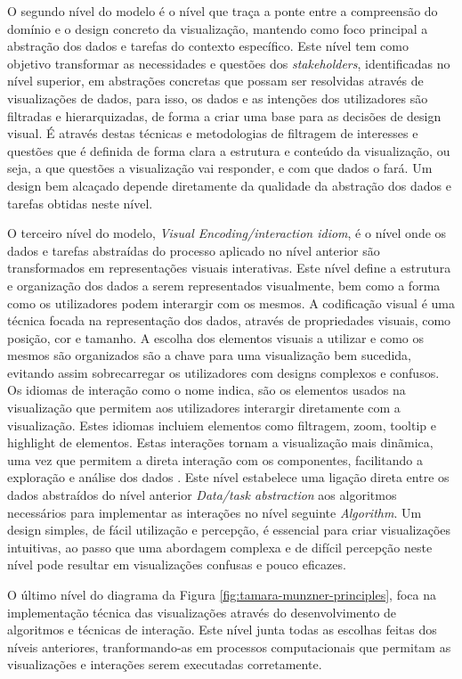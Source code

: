 O segundo nível do modelo é o nível que traça a ponte entre a compreensão do domínio e o design concreto da visualização, mantendo como foco principal a abstração dos dados e tarefas  do contexto específico. Este nível tem como objetivo transformar as necessidades e questões dos \textit{stakeholders}, identificadas no nível superior, em abstrações concretas que possam ser resolvidas através de visualizações de dados, para isso, os dados e as intenções dos utilizadores são filtradas e hierarquizadas, de forma a criar uma base para as decisões de design visual. 
É através destas técnicas e metodologias de filtragem de interesses e questões que é definida de forma clara a estrutura e conteúdo da visualização, ou seja, a que questões a visualização vai responder, e com que dados o fará. Um design bem alcaçado depende diretamente da qualidade da abstração dos dados e tarefas obtidas neste nível.

O terceiro nível do modelo, \textit{Visual Encoding/interaction idiom}, é o nível onde os dados e tarefas abstraídas do processo aplicado no nível anterior são transformados em representações visuais interativas. Este nível define a estrutura e organização dos dados a serem representados visualmente, bem como a forma como os utilizadores podem interargir com os mesmos.
A codificação visual é uma técnica focada na representação dos dados, através de propriedades visuais, como posição, cor e tamanho. A escolha dos elementos visuais a utilizar e como os mesmos são organizados são a chave para uma visualização bem sucedida, evitando assim sobrecarregar os utilizadores com designs complexos e confusos.
Os idiomas de interação como o nome indica, são os elementos usados na visualização que permitem aos utilizadores interargir diretamente com a visualização. Estes idiomas incluiem elementos como filtragem, zoom, tooltip e highlight de elementos. Estas interações tornam a visualização mais dinãmica, uma vez que permitem a direta interação com os componentes, facilitando a exploração e análise dos dados \cite{figueiras2015towards}.
Este nível estabelece uma ligação direta entre os dados abstraídos do nível anterior \textit{Data/task abstraction} aos algoritmos necessários para implementar as interações no nível seguinte \textit{Algorithm}. Um design simples, de fácil utilização e percepção, é essencial para criar visualizações intuitivas, ao passo que uma abordagem complexa e de difícil percepção neste nível pode resultar em visualizações confusas e pouco eficazes.

O último nível do diagrama da Figura \ref{fig:tamara-munzner-principles}, foca na implementação técnica das visualizações através do desenvolvimento de algoritmos e técnicas de interação. Este nível junta todas as escolhas feitas dos níveis anteriores, tranformando-as em processos computacionais que permitam as visualizações e interações serem executadas corretamente.

